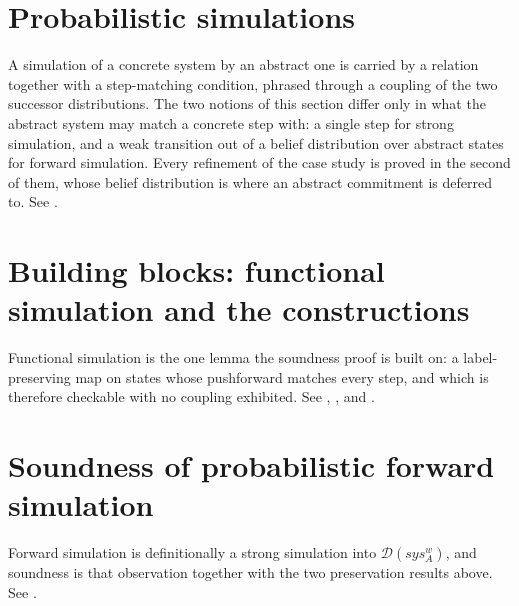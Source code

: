 





\section{Probabilistic simulations}

A simulation of a concrete system by an abstract one is carried by a relation together with a step-matching condition, phrased through a coupling of the two successor distributions.
The two notions of this section differ only in what the abstract system may match a concrete step with: a single step for strong simulation, and a weak transition out of a belief distribution over abstract states for forward simulation.
Every refinement of the case study is proved in the second of them, whose belief distribution is where an abstract commitment is deferred to.
See .





\section{Building blocks: functional simulation and the constructions}

Functional simulation is the one lemma the soundness proof is built on: a label-preserving map on states whose pushforward matches every step, and which is therefore checkable with no coupling exhibited.
See , ,  and .






\section{Soundness of probabilistic forward simulation}
\label{sec:soundness}

Forward simulation is definitionally a strong simulation into $\mathcal{D}(sys_A^w)$, and soundness is that observation together with the two preservation results above.
See .

